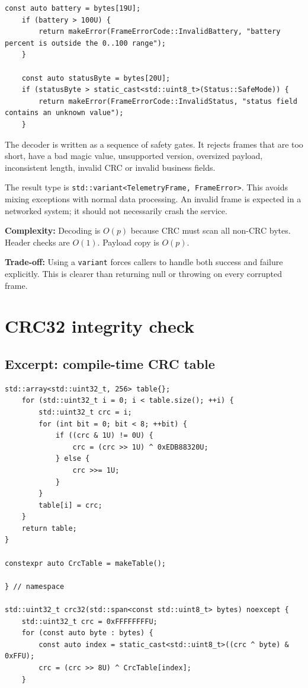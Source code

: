 \documentclass[10pt,a4paper]{article}
\newcommand{\complexity}[1]{\textbf{Complexity:} #1}
\newcommand{\tradeoff}[1]{\textbf{Trade-off:} #1}
\begin{document}
\begin{lstlisting}[caption={Strict decoding and domain errors}]
    const auto battery = bytes[19U];
    if (battery > 100U) {
        return makeError(FrameErrorCode::InvalidBattery, "battery percent is outside the 0..100 range");
    }

    const auto statusByte = bytes[20U];
    if (statusByte > static_cast<std::uint8_t>(Status::SafeMode)) {
        return makeError(FrameErrorCode::InvalidStatus, "status field contains an unknown value");
    }

\end{lstlisting}


The decoder is written as a sequence of safety gates. It rejects frames that are too short, have a bad magic value, unsupported version, oversized payload, inconsistent length, invalid CRC or invalid business fields.

The result type is \texttt{std::variant<TelemetryFrame, FrameError>}. This avoids mixing exceptions with normal data processing. An invalid frame is expected in a networked system; it should not necessarily crash the service.

\complexity{Decoding is $O(p)$ because CRC must scan all non-CRC bytes. Header checks are $O(1)$. Payload copy is $O(p)$.}

\tradeoff{Using a \texttt{variant} forces callers to handle both success and failure explicitly. This is clearer than returning null or throwing on every corrupted frame.}

\section{CRC32 integrity check}

\subsection{Excerpt: compile-time CRC table}
\begin{lstlisting}[caption={Table-driven CRC32}]
    std::array<std::uint32_t, 256> table{};
    for (std::uint32_t i = 0; i < table.size(); ++i) {
        std::uint32_t crc = i;
        for (int bit = 0; bit < 8; ++bit) {
            if ((crc & 1U) != 0U) {
                crc = (crc >> 1U) ^ 0xEDB88320U;
            } else {
                crc >>= 1U;
            }
        }
        table[i] = crc;
    }
    return table;
}

constexpr auto CrcTable = makeTable();

} // namespace

std::uint32_t crc32(std::span<const std::uint8_t> bytes) noexcept {
    std::uint32_t crc = 0xFFFFFFFFU;
    for (const auto byte : bytes) {
        const auto index = static_cast<std::uint8_t>((crc ^ byte) & 0xFFU);
        crc = (crc >> 8U) ^ CrcTable[index];
    }
\end{lstlisting}
\end{document}
